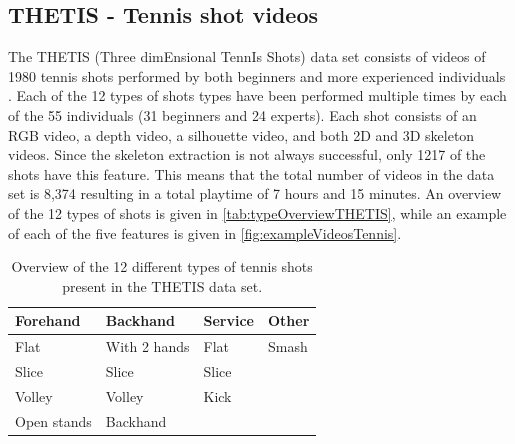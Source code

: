 \subsection{THETIS - Tennis shot videos}
The THETIS (Three dimEnsional TennIs Shots) data set consists of videos of 1980 tennis shots performed by both beginners and more experienced individuals \cite{Gourgari2013}. Each of the 12 types of shots types have been performed multiple times by each of the 55 individuals (31 beginners and 24 experts). Each shot consists of an RGB video, a depth video, a silhouette video, and both 2D and 3D skeleton videos. Since the skeleton extraction is not always successful, only 1217 of the shots have this feature. This means that the total number of videos in the data set is 8,374 resulting in a total playtime of 7 hours and 15 minutes. An overview of the 12 types of shots is given in \autoref{tab:typeOverviewTHETIS}, while an example of each of the five features is given in \autoref{fig:exampleVideosTennis}. 

\begin{table}
\centering
\caption{Overview of the 12 different types of tennis shots present in the THETIS data set.}
\label{tab:typeOverviewTHETIS}
\begin{tabular}{l|l|l|l}
\textbf{Forehand}    & \textbf{Backhand}     & \textbf{Service} & \textbf{Other} \\ \hline
Flat        & With 2 hands & Flat    & Smash \\
Slice       & Slice        & Slice   &       \\
Volley      & Volley       & Kick    &       \\
Open stands & Backhand     &         &      
\end{tabular}
\end{table}

